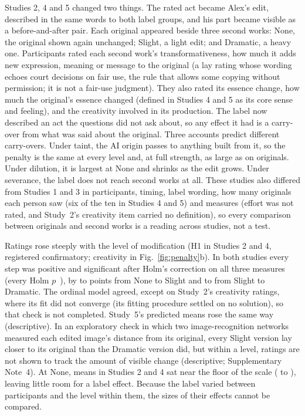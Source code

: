 Studies 2, 4 and 5 changed two things. The rated act became Alex's edit, described in the same words to both label groups, and his part became visible as a before-and-after pair. Each original appeared beside three second works: None, the original shown again unchanged; Slight, a light edit; and Dramatic, a heavy one. Participants rated each second work's transformativeness, how much it adds new expression, meaning or message to the original (a lay rating whose wording echoes court decisions on fair use, the rule that allows some copying without permission; it is not a fair-use judgment). They also rated its essence change, how much the original's essence changed (defined in Studies 4 and 5 as its core sense and feeling), and the creativity involved in its production. The label now described an act the questions did not ask about, so any effect it had is a carry-over from what was said about the original. Three accounts predict different carry-overs. Under taint, the AI origin passes to anything built from it, so the penalty is the same at every level and, at full strength, as large as on originals. Under dilution, it is largest at None and shrinks as the edit grows. Under severance, the label does not reach second works at all. These studies also differed from Studies 1 and 3 in participants, timing, label wording, how many originals each person saw (six of the ten in Studies 4 and 5) and measures (effort was not rated, and Study~2's creativity item carried no definition), so every comparison between originals and second works is a reading across studies, not a test.

Ratings rose steeply with the level of modification (H1 in Studies 2 and 4, registered confirmatory; creativity in Fig.~\ref{fig:penalty}b). In both studies every step was positive and significant after Holm's correction on all three measures (every Holm $p$~\STwoCreatSlightMinusNonePHolm), by \STwoCreatSlightMinusNoneEst{} to \SFourTransSlightMinusNoneEst{} points from None to Slight and \SFourCreatDramaticMinusSlightEst{} to \STwoTransDramaticMinusSlightEst{} from Slight to Dramatic. The ordinal model agreed, except on Study~2's creativity ratings, where its fit did not converge (its fitting procedure settled on no solution), so that check is not completed. Study~5's predicted means rose the same way (descriptive). In an exploratory check in which two image-recognition networks measured each edited image's distance from its original,\cite{oquab2024dinov2,radford2021learning} every Slight version lay closer to its original than the Dramatic version did, but within a level, ratings are not shown to track the amount of visible change (descriptive; Supplementary Note~4). At None, means in Studies 2 and 4 sat near the floor of the scale (\STwoTransMeanNone{} to \SFourCreatMeanNone), leaving little room for a label effect. Because the label varied between participants and the level within them, the sizes of their effects cannot be compared.

